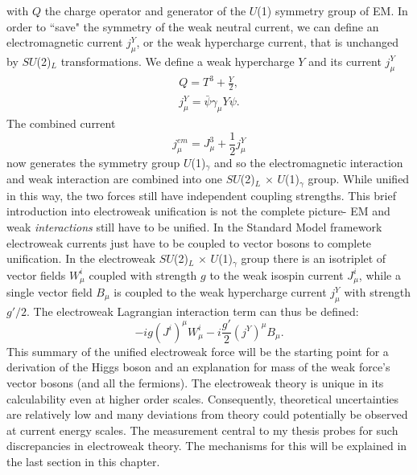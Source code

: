 with $Q$ the charge operator and generator of the $U$(1) symmetry group of EM. In order to ``save" the symmetry of the weak neutral current, we can define an electromagnetic current $j_\mu^Y$, or the weak hypercharge current, that is unchanged by $SU$(2)$_L$ transformations. We define a weak hypercharge $Y$ and its current $j_\mu^Y$
\begin{equation}
\begin{split}
Q=T^3+\frac{Y}{2}, \\
j_\mu^Y =\bar{\psi}\gamma_\mu Y \psi.
\end{split}
\end{equation}
The combined current 
\begin{equation}
j_\mu^{em} = J_\mu^3+\frac{1}{2}j_\mu^Y
\end{equation}
now generates the symmetry group $U$(1)$_\gamma$ and so the electromagnetic interaction and weak interaction are combined into one $SU$(2)$_L$ $\times$ $U$(1)$_\gamma$ group. While unified in this way, the two forces still have independent coupling strengths. This brief introduction into electroweak unification is not the complete picture- EM and weak \textit{interactions} still have to be unified. In the Standard Model framework electroweak currents just have to be coupled to vector bosons to complete unification. In the electroweak $SU$(2)$_L$ $\times$ $U$(1)$_\gamma$ group there is an isotriplet of vector fields $W_\mu^i$ coupled with strength $g$ to the weak isospin current $J_\mu^i$, while a single vector field $B_\mu$ is coupled to the weak hypercharge current $j_\mu^Y$ with strength $g'/2$. The electroweak Lagrangian interaction term can thus be defined:
\begin{equation}
-i g (J^i)^\mu W_\mu^i-i\frac{g'}{2}(j^Y)^\mu B_\mu .
\end{equation}
This summary of the unified electroweak force will be the starting point for a derivation of the Higgs boson and an explanation for mass of the weak force's vector bosons (and all the fermions). The electroweak theory is unique in its calculability even at higher order scales. Consequently, theoretical uncertainties are relatively low and many deviations from theory could potentially be observed at current energy scales. The measurement central to my thesis probes for such discrepancies in electroweak theory. The mechanisms for this will be explained in the last section in this chapter. 

